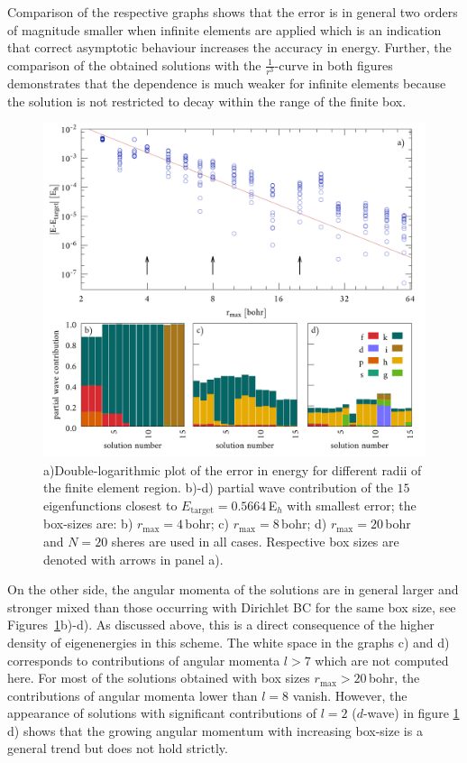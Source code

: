 Comparison of the respective graphs shows that the error is in general two orders of magnitude smaller when infinite elements are applied which is an indication that correct asymptotic behaviour increases the accuracy in energy.
Further, the comparison of the obtained solutions with the $\frac{1}{r^3}$-curve in both figures demonstrates that the dependence is much weaker for infinite elements because the solution is not restricted to decay within the range of the finite box.
\begin{figure}[h]
\includegraphics[width=\textwidth]{Figures/BC/BoxsInfEL}
\caption{a)Double-logarithmic plot of the error in energy for different radii of the finite element region.
b)-d) partial wave contribution  of the $15$ eigenfunctions closest to $E_\text{target}=0.5664$\,E$_h$ with smallest error;
the box-sizes are: b) $r_\text{max}=4\,$bohr; c) $r_\text{max}=8\,$bohr; d) $r_\text{max}=20\,$bohr and $N=20$ sheres are used in all cases. Respective box sizes are denoted with arrows in panel a).}
\label{fig:InfBoxs}
\end{figure}
On the other side, the angular momenta of the solutions are in general larger and stronger mixed than those occurring with Dirichlet BC for the same box size, see Figures~\ref{fig:InfBoxs}b)-d).
As discussed above, this is a direct consequence of the higher density of eigenenergies in this scheme.
The white space in the graphs c) and d) corresponds to contributions of angular momenta $l>7$ which are not computed here.
For most of the solutions obtained with box sizes $r_\text{max}>20\,$bohr, the contributions of angular momenta lower than $l=8$ vanish.
However, the appearance of solutions with significant contributions of $l=2$ ($d$-wave) in figure \ref{fig:InfBoxs} d) shows that the growing angular momentum with increasing box-size is a general trend but does not hold strictly.

